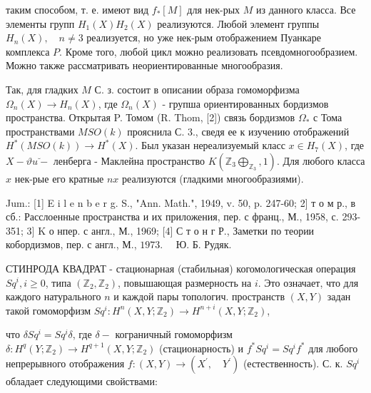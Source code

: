 \documentclass[10pt]{article}
\begin{document}
таким способом, т. е. имеют вид $f_{*}[M]$ для нек-рых $M$ из данного класса. Все элементы групп $H_{1}(X) H_{2}(X)$ реализуются. Любой элемент группы $H_{n}(X), \quad n \neq 3$ реализуется, но уже нек-рым отображением Пуанкаре комплекса $P$. Кроме того, любой цикл можно реализовать псевдомногообразием. Можно также рассматривать неориентированные многообразия.



Так, для гладких $M$ С. з. состоит в описании образа гомоморфизма $\Omega_{n}(X) \rightarrow H_{n}(X)$, где $\Omega_{n}(X)$ - групша ориентированных бордизмов пространства. Открытая P. Томом (R. Thom, [2]) связь бордизмов $\Omega_{*}$ с Тома пространствами $M S O(k)$ прояснила С. 3., сведя ее к изучению отображений $H^{*}(M S O(k)) \rightarrow H^{*}(X)$. Был указан нереализуемый класс $x \in H_{7}(X)$, где $X-\vartheta \breve{u-}$ ленберга - Маклейна пространство $K\left(\mathbb{Z}_{3} \bigoplus_{\mathbb{Z}_{3}}, 1\right)$. Для любого класса $x$ нек-рые его кратные $n x$ реализуются (гладкими многообразиями).



Jum.: [1] E i l e n b e r g. S., "Ann. Math.", 1949, v. 50, p. 247-60; 2] т о м р., в сб.: Расслоенные пространства и их приложения, пер. с франц., М., 1958, с. 293-351; 3$]$ K о нпер. с англ., М., 1969; [4] С т о н г Р., Заметки по теории кобордизмов, пер. с англ., М., $1973 . \quad$ Ю. Б. Рудяк.



СТИНРОДА КВАДРАТ - стационарная (стабильная) когомологическая операция $S q^{i}, i \geqslant 0$, типа $\left(\mathbb{Z}_{2}, \mathbb{Z}_{2}\right)$, повышающая размерность на $i$. Это означает, что для каждого натурального $n$ и каждой пары топологич. пространств $(X, Y)$ задан такой гомоморфизм $S q^{i}: H^{n}\left(X, Y ; \mathbb{Z}_{2}\right) \longrightarrow H^{n+i}\left(X, Y ; \mathbb{Z}_{2}\right)$,



что $\delta S q^{i}=S q^{i} \delta$, где $\delta-$ кограничный гомоморфизм $\delta: H^{q}\left(Y ; \mathbb{Z}_{2}\right) \rightarrow H^{q+1}\left(X, Y ; \mathbb{Z}_{2}\right)$ (стационарность) и $f^{*} S q^{i}=S q^{i} f^{*}$ для любого непрерывного отображения $f:(X, Y) \rightarrow\left(X^{\prime}, \quad Y^{\prime}\right)$ (естественность). С. к. $S q^{i}$ обладает следующими свойствами:
\end{document}

